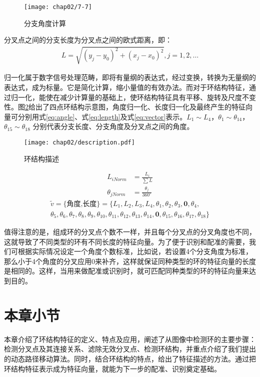 \begin{figure}[H]
\centering
\texttt{[image: chap02/7-7]}
\caption{分支角度计算}
\label{fig:calculate-angles}
\end{figure}

分叉点之间的分支长度为分叉点之间的欧式距离，即：
\begin{align}
L = \sqrt{(y_j - y_0)^2 + (x_j - x_0)^2}, j = 1, 2, \ldots
\end{align}

归一化属于数字信号处理范畴，即将有量纲的表达式，经过变换，转换为无量纲的表达式，成为标量。它是简化计算，缩小量值的有效办法。而对于环结构特征，通过归一化，能使在减少计算量的基础上，使环结构特征具有平移、旋转及尺度不变性。图\ref{fig:description}给出了四点环结构示意图，角度归一化、长度归一化及最终产生的特征向量可分别用式\ref{eq:angle}、式\ref{eq:length}及式\ref{eq:vector}表示。$L_{1} \sim L_{4}$，$\theta_{1} \sim \theta_{14}$，$\theta_{15} \sim \theta_{18}$ 分别代表分支长度、分支角度及分叉点之间的角度。

\begin{figure}[H]
\centering
\texttt{[image: chap02/description.pdf]}
\caption{环结构描述}
\label{fig:description}
\end{figure}
\begin{align}
L_{iNorm}&=\frac{L_i}{\sum{L}}\label{eq:length}\\
\theta_{jNorm}&=\frac{\theta_j}{360^\circ}\label{eq:angle}
\end{align}
\begin{multline}
\tilde{v}=\{\textrm{角度,长度}\}=\{L_{1},L_{2},L_{3},L_{4},\theta_{1},\theta_{2},\theta_{3},\mathbf{0},\theta_{4},\\\theta_{5},\theta_{6},\theta_{7},\theta_{8},\theta_{9},\theta_{10},\theta_{11},\theta_{12},\theta_{13},\theta_{14},\mathbf{0},\theta_{15},\theta_{16},\theta_{17},\theta_{18}\}
\label{eq:vector}
\end{multline}

值得注意的是，组成环的分叉点个数不一样，并且每个分叉点的分叉角度也不同，这就导致了不同类型的环有不同长度的特征向量。为了便于识别和配准的需要，我们可根据实际情况设定一个角度个数标准，比如说，若设置4个分支角度为标准，那么小于4个角度的分叉应用0来补齐，这样就保证同种类型的环的特征向量的长度是相同的。这样，当用来做配准或识别时，就可匹配同种类型的环的特征向量来达到目的。

\section{本章小节}
\label{}

本章介绍了环结构特征的定义、特点及应用，阐述了从图像中检测环的主要步骤：检测分叉点及其连接关系、滤除无效分叉点、检测环结构，并重点介绍了我们提出的动态路径移动算法。同时，结合环结构的特点，给出了特征描述的方法。通过把环结构特征表示成为特征向量，就能为下一步的配准、识别奠定基础。
